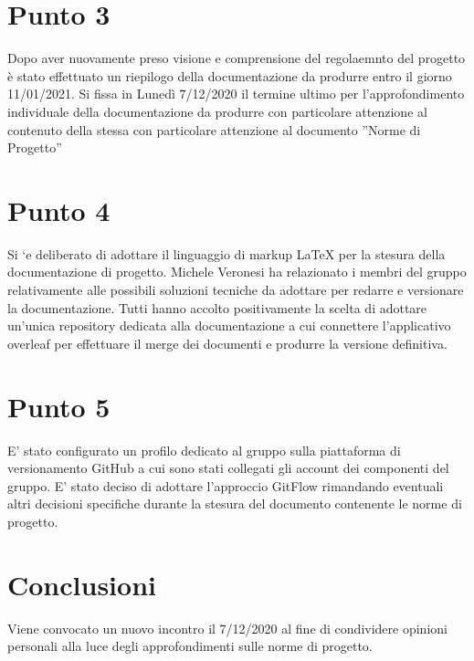 \documentclass[12pt,italian,a4paper]{article}
\begin{document}
	\section*{Punto 3}
	Dopo aver nuovamente preso visione e comprensione del regolaemnto del progetto è stato effettuato un riepilogo della documentazione da produrre entro il giorno 11/01/2021. Si fissa in Lunedì 7/12/2020 il termine ultimo per l’approfondimento individuale della documentazione da produrre con particolare attenzione al contenuto della stessa con particolare attenzione al documento ”Norme di Progetto”

	\section*{Punto 4}

    Si `e deliberato di adottare il linguaggio di markup LaTeX per la stesura della documentazione di progetto. Michele Veronesi ha relazionato i membri del gruppo relativamente alle possibili soluzioni tecniche da adottare per redarre e versionare la documentazione. Tutti hanno accolto positivamente la scelta di adottare un’unica repository dedicata alla documentazione a cui connettere l’applicativo overleaf per effettuare il merge dei documenti e produrre la versione definitiva.

	\section*{Punto 5}
    E’ stato configurato un profilo dedicato al gruppo sulla piattaforma di versionamento GitHub a cui sono stati collegati gli account dei componenti del gruppo. E’ stato deciso di adottare l’approccio GitFlow rimandando eventuali altri decisioni specifiche durante la stesura del documento contenente le norme di progetto.


	\section*{Conclusioni}
	Viene convocato un nuovo incontro il 7/12/2020 al fine di condividere opinioni personali alla luce degli approfondimenti sulle norme di progetto.
\end{document}
